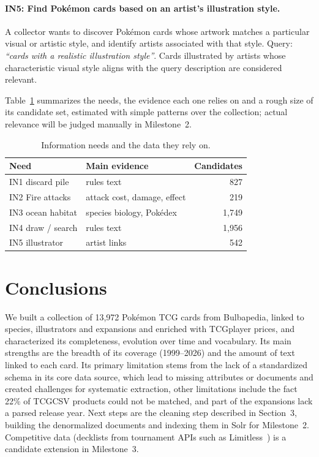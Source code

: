 \documentclass[sigconf]{acmart}
\begin{document}
  \paragraph{IN5: Find Pokémon cards based on an artist's illustration style.}
  A collector wants to discover Pokémon cards whose artwork matches a particular visual or artistic style, and identify artists associated with that style. Query:
  \textit{``cards with a realistic illustration style''}. Cards illustrated by artists whose characteristic visual style aligns with the query description are considered relevant.

  Table~\ref{tab:needs} summarizes the needs, the evidence each one relies on
  and a rough size of its candidate set, estimated with simple patterns over
  the collection; actual relevance will be judged manually in Milestone~2.

  \begin{table}[ht]
      \centering
      \caption{Information needs and the data they rely on.}
      \label{tab:needs}
      \small
      \setlength{\tabcolsep}{4pt}
      \begin{tabular}{llr}
          \hline
          \textbf{Need} & \textbf{Main evidence} & \textbf{Candidates} \\
          \hline
          IN1 discard pile & rules text & 827 \\
          IN2 Fire attacks & attack cost, damage, effect & 219 \\
          IN3 ocean habitat & species biology, Pok\'edex & 1{,}749 \\
          IN4 draw / search & rules text & 1{,}956 \\
          IN5 illustrator & artist links & 542 \\
          \hline
      \end{tabular}
  \end{table}


  \section{Conclusions}

  We built a collection of 13{,}972 Pok\'emon TCG cards from Bulbapedia,
  linked to species, illustrators and expansions and enriched with TCGplayer
  prices, and characterized its completeness, evolution over time and
  vocabulary. Its main strengths are the breadth of its coverage (1999--2026)
  and the amount of text linked to each card. Its primary limitation stems from the lack of a standardized schema in its core data source, which lead to missing attributes or documents and created challenges for systematic extraction, other limitations include the fact 22\% of TCGCSV products could not be matched, and part of the
  expansions lack a parsed release year. Next steps are the cleaning step
  described in Section~3, building the denormalized documents and indexing
  them in Solr for Milestone~2. Competitive data (decklists from tournament
  APIs such as Limitless~\cite{limitless}) is a candidate extension in
  Milestone~3.
\end{document}
